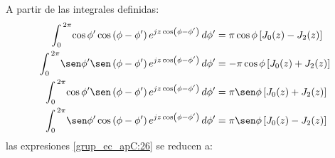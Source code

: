 A partir de las integrales definidas:
\begin{subequations}
\label{grup_ec_apC:27}
\begin{align}
\int_{0}^{\,2\pi}\!\cos\phi '\cos\left(\phi - \phi '\right)e^{jz\cos\left(\phi - \phi '\right)}\,d\phi ' &= \pi\cos\phi\left[J_0\!\left(z\right) - J_2\!\left(z\right)\right]
\label{ec_apC:121}\\
\int_{0}^{\,2\pi}\!\sen\phi '\sen\left(\phi - \phi '\right)e^{jz\cos\left(\phi - \phi '\right)}\,d\phi ' &= -\pi\cos\phi\left[J_0\!\left(z\right) + J_2\!\left(z\right)\right]
\label{ec_apC:122}\\
\int_{0}^{\,2\pi}\!\cos\phi '\sen\left(\phi - \phi '\right)e^{jz\cos\left(\phi - \phi '\right)}\,d\phi ' &= \pi\sen\phi\left[J_0\!\left(z\right) + J_2\!\left(z\right)\right]
\label{ec_apC:123}\\
\int_{0}^{\,2\pi}\!\sen\phi '\cos\left(\phi - \phi '\right)e^{jz\cos\left(\phi - \phi '\right)}\,d\phi ' &= \pi\sen\phi\left[J_0\!\left(z\right) - J_2\!\left(z\right)\right]
\label{ec_apC:124}
\end{align}
\end{subequations}
las expresiones \eqref{grup_ec_apC:26} se reducen a:
